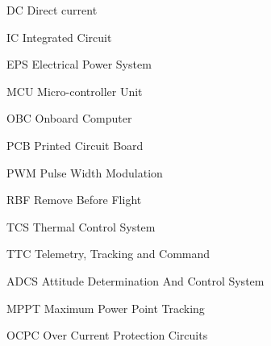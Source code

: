 \begin{abbrv}
	
	\item[DC]  Direct current
	\item[IC]  Integrated Circuit
	\item[EPS] Electrical Power System
	 \item[MCU] Micro-controller Unit
	
	\item[OBC] Onboard Computer
	\item[PCB] Printed Circuit Board 
	\item[PWM] Pulse Width Modulation
	\item[RBF] Remove Before Flight
	\item[TCS] Thermal Control System
	\item[TTC] Telemetry, Tracking and Command
	\item[ADCS] Attitude Determination And Control System
	\item[MPPT] Maximum Power Point Tracking
	\item[OCPC] Over Current Protection Circuits
\end{abbrv}

